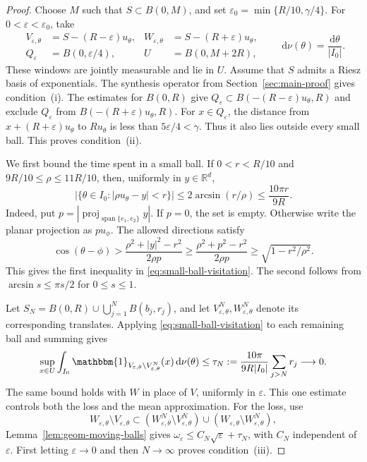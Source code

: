 \documentclass[12pt,reqno,tbtags]{amsart}
\def\R{\mathbb{R}}
\def\d{\mathrm{d}}
\newcommand\1{\mathbbm{1}}
\newcommand{\eps}{\varepsilon}
\def\d{\mathrm{d}}
\begin{document}
\begin{proof}
Choose $M$ such that $S\subset B(0,M)$, and set
$\eps_0=\min\{R/10,\gamma/4\}$. For $0<\eps<\eps_0$, take
\begin{equation}\label{eq:countable-windows}
    \begin{aligned}
    V_{\eps,\theta}&=S-(R-\eps)u_\theta,&
    W_{\eps,\theta}&=S-(R+\eps)u_\theta,\\
    Q_\eps&=B(0,\eps/4),& U&=B(0,M+2R),
    \end{aligned}
    \qquad \d\nu(\theta)=\frac{\d\theta}{|I_0|}.
\end{equation}
These windows are jointly measurable and lie in $U$.
Assume that $S$ admits a Riesz basis of exponentials.
The synthesis operator from Section~\ref{sec:main-proof} gives condition~(i).
The estimates for $B(0,R)$ give
$Q_\eps\subset B(-(R-\eps)u_\theta,R)$ and exclude $Q_\eps$ from
$B(-(R+\eps)u_\theta,R)$.
For $x\in Q_\eps$, the distance from $x+(R+\eps)u_\theta$ to
$Ru_\theta$ is less than $5\eps/4<\gamma$.
Thus it also lies outside every small ball. This proves condition~(ii).

We first bound the time spent in a small ball. If $0<r<R/10$ and
$9R/10\le\rho\le11R/10$, then, uniformly in $y\in\R^d$,
\begin{equation}\label{eq:small-ball-visitation}
    |\{\theta\in I_0:|\rho u_\theta-y|<r\}|
    \le 2\arcsin(r/\rho)\le\frac{10\pi r}{9R}.
\end{equation}
Indeed, put $p=|\operatorname{proj}_{\operatorname{span}\{e_1,e_2\}}y|$.
If $p=0$, the set is empty. Otherwise write the planar projection as $p u_\phi$.
The allowed directions satisfy
\begin{equation*}
    \cos(\theta-\phi)>
    \frac{\rho^2+|y|^2-r^2}{2\rho p}
    \ge\frac{\rho^2+p^2-r^2}{2\rho p}
    \ge\sqrt{1-r^2/\rho^2}.
\end{equation*}
This gives the first inequality in \eqref{eq:small-ball-visitation}.
The second follows from $\arcsin s\le\pi s/2$ for $0\le s\le1$.

Let $S_N=B(0,R)\cup\bigcup_{j=1}^{N}B(b_j,r_j)$, and let
$V^N_{\eps,\theta},W^N_{\eps,\theta}$ denote its corresponding translates.
Applying \eqref{eq:small-ball-visitation} to each remaining ball and summing gives
\begin{equation}\label{eq:countable-tail}
    \sup_{x\in U}\int_{I_0}
    \1_{V_{\eps,\theta}\setminus V^N_{\eps,\theta}}(x)\,\d\nu(\theta)
    \le\tau_N:=\frac{10\pi}{9R|I_0|}\sum_{j>N}r_j\longrightarrow0.
\end{equation}
The same bound holds with $W$ in place of $V$, uniformly in $\eps$.
This one estimate controls both the loss and the mean approximation.
For the loss, use
\begin{equation*}
    W_{\eps,\theta}\setminus V_{\eps,\theta}
    \subset (W^N_{\eps,\theta}\setminus V^N_{\eps,\theta})
       \cup(W_{\eps,\theta}\setminus W^N_{\eps,\theta}),
\end{equation*}
Lemma~\ref{lem:geom-moving-balls} gives
$\omega_\eps\le C_N\sqrt\eps+\tau_N$, with $C_N$ independent of $\eps$.
First letting $\eps\to0$ and then $N\to\infty$ proves condition~(iii).


\end{proof}
\end{document}
